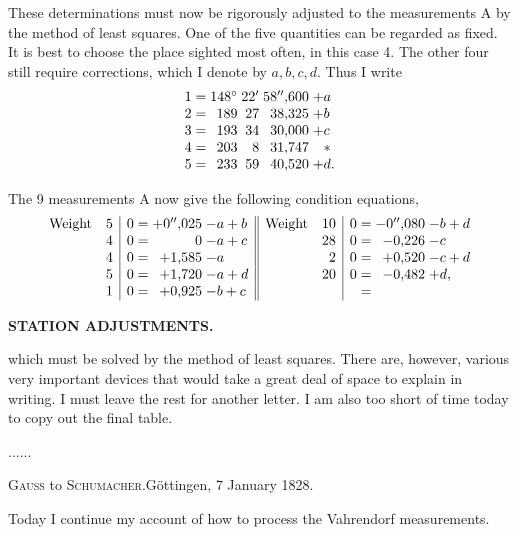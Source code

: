These determinations must now be rigorously adjusted to  the measurements A by the method of least squares. One of the five quantities can be regarded as fixed. It is best to choose the place sighted most often, in this case 4. The other four still require corrections, which I denote by \(a,b,c,d\). Thus I write
\[
\begin{array}{@{}r@{\;=\;}r@{\;}r@{\;}r@{\;}l@{}}
 1&148^\circ&22'&58''{,}600&+a\\
 2&189&27&38{,}325&+b\\
 3&193&34&30{,}000&+c\\
 4&203&8&31{,}747&\phantom{+}*\\
 5&233&59&40{,}520&+d.
\end{array}
\]

The 9 measurements A now give the following condition equations,
\[
\begin{array}{@{}lr|r@{\;=\;}r@{\;}l||lr|r@{\;=\;}r@{\;}l@{}}
 \text{Weight}&5&0&+0''{,}025&-a+b&
 \text{Weight}&10&0&-0''{,}080&-b+d\\
 &4&0&0&-a+c&&28&0&-0{,}226&-c\\
 &4&0&+1{,}585&-a&&2&0&+0{,}520&-c+d\\
 &5&0&+1{,}720&-a+d&&20&0&-0{,}482&+d,\\
 &1&0&+0{,}925&-b+c&&&&&
\end{array}
\]

\par\clearpage
\noindent\null\hfill{\small\textbf{STATION ADJUSTMENTS.}}\hfill{}\par\medskip

\noindent which must be solved by the method of least squares. There are, however, various very important devices that would take a great deal of space to explain in writing. I must leave the rest for another letter. I am also too short of time today to copy out the final table.

.\enspace.\enspace.\enspace.\enspace.\enspace.

\vspace{1.4cm}
\begin{center}
 \textsc{Gauss} to \textsc{Schumacher}.\quad Göttingen, 7 January 1828.
\end{center}

Today I continue my account of how to process the Vahrendorf measurements.


